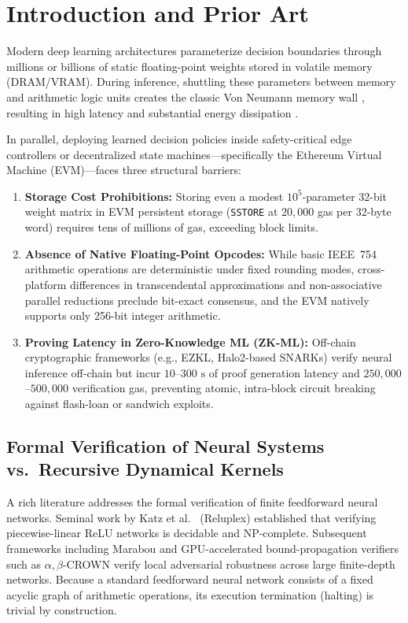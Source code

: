 \documentclass[10pt,a4paper]{article}
\begin{document}
\section{Introduction and Prior Art}

Modern deep learning architectures parameterize decision boundaries through millions or billions of static floating-point weights stored in volatile memory (DRAM/VRAM). During inference, shuttling these parameters between memory and arithmetic logic units creates the classic Von Neumann memory wall \cite{wulf1995}, resulting in high latency and substantial energy dissipation \cite{vaswani2017, achiam2023}.

In parallel, deploying learned decision policies inside safety-critical edge controllers or decentralized state machines---specifically the Ethereum Virtual Machine (EVM)---faces three structural barriers:
\begin{enumerate}[leftmargin=1.6em,itemsep=1pt,topsep=2pt]
    \item \textbf{Storage Cost Prohibitions:} Storing even a modest $10^5$-parameter 32-bit weight matrix in EVM persistent storage (\texttt{SSTORE} at $20,000$ gas per 32-byte word) requires tens of millions of gas, exceeding block limits.
    \item \textbf{Absence of Native Floating-Point Opcodes:} While basic IEEE~754 arithmetic operations are deterministic under fixed rounding modes, cross-platform differences in transcendental approximations and non-associative parallel reductions preclude bit-exact consensus, and the EVM natively supports only 256-bit integer arithmetic.
    \item \textbf{Proving Latency in Zero-Knowledge ML (ZK-ML):} Off-chain cryptographic frameworks (e.g., EZKL, Halo2-based SNARKs) verify neural inference off-chain but incur $10$--$300\text{ s}$ of proof generation latency and $250,000$--$500,000$ verification gas, preventing atomic, intra-block circuit breaking against flash-loan or sandwich exploits.
\end{enumerate}

\subsection{Formal Verification of Neural Systems vs.\ Recursive Dynamical Kernels}
A rich literature addresses the formal verification of finite feedforward neural networks. Seminal work by Katz et al.\ \cite{katz2017} (Reluplex) established that verifying piecewise-linear ReLU networks is decidable and NP-complete. Subsequent frameworks including Marabou \cite{katz2019} and GPU-accelerated bound-propagation verifiers such as $\alpha,\beta$-CROWN \cite{wang2021} verify local adversarial robustness across large finite-depth networks. Because a standard feedforward neural network consists of a fixed acyclic graph of arithmetic operations, its execution termination (halting) is trivial by construction.
\end{document}

